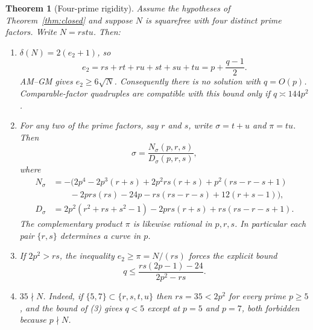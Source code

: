\documentclass[11pt,reqno]{amsart}
\newcommand{\TT}{\delta}
\newtheorem{theorem}{Theorem}
\theoremstyle{definition}
\begin{document}
\begin{theorem}[Four-prime rigidity]
\label{thm:four}
Assume the hypotheses of Theorem~\ref{thm:closed} and suppose \(N\) is squarefree with four distinct prime factors. Write \(N=rstu\). Then:
\begin{enumerate}
\item \(\TT(N)=2(e_2+1)\), so
\[
e_2=rs+rt+ru+st+su+tu=p+\frac{q-1}{2}.
\]
AM--GM gives \(e_2\ge 6\sqrt{N}\). Consequently there is no solution with \(q=O(p)\). Comparable-factor quadruples are compatible with this bound only if \(q\asymp 144p^2\).
\item For any two of the prime factors, say \(r\) and \(s\), write \(\sigma=t+u\) and \(\pi=tu\). Then
\[
\sigma=\frac{N_{\sigma}(p,r,s)}{D_{\sigma}(p,r,s)},
\]
where
\begin{align*}
N_{\sigma}&=-(2p^4-2p^3(r+s)+2p^2rs(r+s)+p^2(rs-r-s+1)\\
&\qquad-2prs(rs)-24p-rs(rs-r-s)+12(r+s-1)),\\
D_{\sigma}&=2p^2(r^2+rs+s^2-1)-2prs(r+s)+rs(rs-r-s+1).
\end{align*}
The complementary product \(\pi\) is likewise rational in \(p,r,s\). In particular each pair \(\{r,s\}\) determines a curve in \(p\).
\item If \(2p^2>rs\), the inequality \(e_2\ge \pi=N/(rs)\) forces the explicit bound
\[
q\le\frac{rs(2p-1)-24}{2p^2-rs}.
\]
\item \(35\nmid N\). Indeed, if \(\{5,7\}\subset\{r,s,t,u\}\) then \(rs=35<2p^2\) for every prime \(p\ge 5\), and the bound of (3) gives \(q<5\) except at \(p=5\) and \(p=7\), both forbidden because \(p\nmid N\).
\end{enumerate}
\end{theorem}
\end{document}
